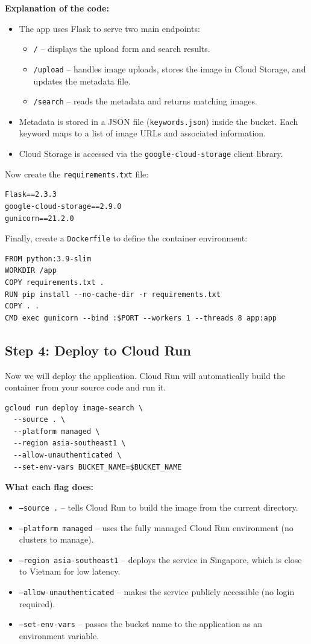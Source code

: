 \documentclass[12pt,a4paper]{article}
\begin{document}
\textbf{Explanation of the code:}
\begin{itemize}
    \item The app uses Flask to serve two main endpoints:
        \begin{itemize}
            \item \texttt{/} – displays the upload form and search results.
            \item \texttt{/upload} – handles image uploads, stores the image in Cloud Storage, and updates the metadata file.
            \item \texttt{/search} – reads the metadata and returns matching images.
        \end{itemize}
    \item Metadata is stored in a JSON file (\texttt{keywords.json}) inside the bucket. Each keyword maps to a list of image URLs and associated information.
    \item Cloud Storage is accessed via the \texttt{google-cloud-storage} client library.
\end{itemize}

Now create the \texttt{requirements.txt} file:
\begin{lstlisting}
Flask==2.3.3
google-cloud-storage==2.9.0
gunicorn==21.2.0
\end{lstlisting}

Finally, create a \texttt{Dockerfile} to define the container environment:
\begin{lstlisting}
FROM python:3.9-slim
WORKDIR /app
COPY requirements.txt .
RUN pip install --no-cache-dir -r requirements.txt
COPY . .
CMD exec gunicorn --bind :$PORT --workers 1 --threads 8 app:app
\end{lstlisting}

\subsection*{Step 4: Deploy to Cloud Run}
Now we will deploy the application. Cloud Run will automatically build the container from your source code and run it.
\begin{lstlisting}
gcloud run deploy image-search \
  --source . \
  --platform managed \
  --region asia-southeast1 \
  --allow-unauthenticated \
  --set-env-vars BUCKET_NAME=$BUCKET_NAME
\end{lstlisting}

\textbf{What each flag does:}
\begin{itemize}
    \item \texttt{--source .} – tells Cloud Run to build the image from the current directory.
    \item \texttt{--platform managed} – uses the fully managed Cloud Run environment (no clusters to manage).
    \item \texttt{--region asia-southeast1} – deploys the service in Singapore, which is close to Vietnam for low latency.
    \item \texttt{--allow-unauthenticated} – makes the service publicly accessible (no login required).
    \item \texttt{--set-env-vars} – passes the bucket name to the application as an environment variable.
\end{itemize}
\end{document}
